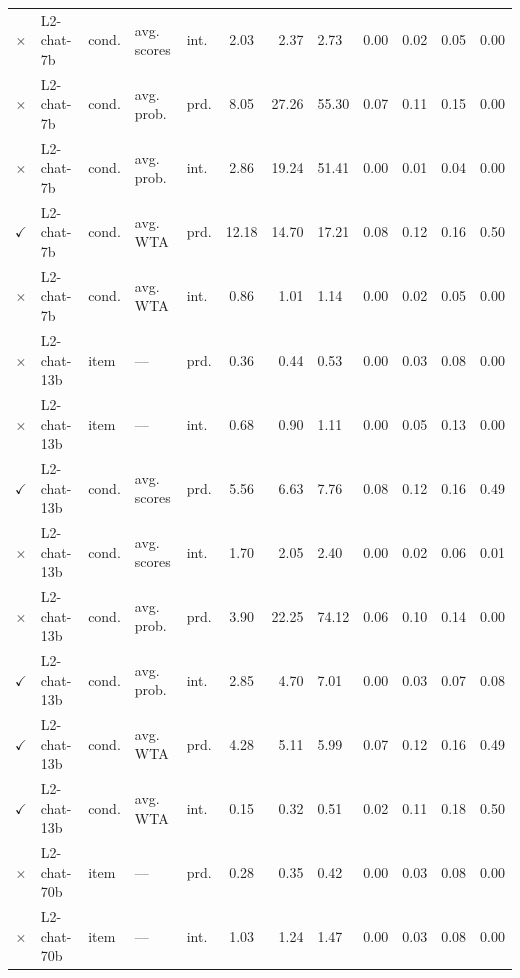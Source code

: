 \documentclass[fleqn]{article}
\begin{document}
\begin{table}[]
\begin{tabular}{cllllcrlcrlc}
  \textcolor{shimmer-main}{$\times$} & L2-chat-7b  & cond. & avg. scores & int. & 2.03  & 2.37   & 2.73   & 0.00 & 0.02 & 0.05 & 0.00 \\
  \textcolor{shimmer-main}{$\times$} & L2-chat-7b  & cond. & avg. prob.  & prd. & 8.05  & 27.26  & 55.30  & 0.07 & 0.11 & 0.15 & 0.00 \\
  \textcolor{shimmer-main}{$\times$} & L2-chat-7b  & cond. & avg. prob.  & int. & 2.86  & 19.24  & 51.41  & 0.00 & 0.01 & 0.04 & 0.00 \\
  \textcolor{fern-main}{$\checkmark$} & L2-chat-7b  & cond. & avg. WTA    & prd. & 12.18 & 14.70  & 17.21  & 0.08 & 0.12 & 0.16 & 0.50 \\
  \textcolor{shimmer-main}{$\times$} & L2-chat-7b  & cond. & avg. WTA    & int. & 0.86  & 1.01   & 1.14   & 0.00 & 0.02 & 0.05 & 0.00 \\ \addlinespace[0.5em]
  \textcolor{shimmer-main}{$\times$} & L2-chat-13b & item  & ---         & prd. & 0.36  & 0.44   & 0.53   & 0.00 & 0.03 & 0.08 & 0.00 \\
  \textcolor{shimmer-main}{$\times$} & L2-chat-13b & item  & ---         & int. & 0.68  & 0.90   & 1.11   & 0.00 & 0.05 & 0.13 & 0.00 \\
  \textcolor{fern-main}{$\checkmark$} & L2-chat-13b & cond. & avg. scores & prd. & 5.56  & 6.63   & 7.76   & 0.08 & 0.12 & 0.16 & 0.49 \\
  \textcolor{shimmer-main}{$\times$} & L2-chat-13b & cond. & avg. scores & int. & 1.70  & 2.05   & 2.40   & 0.00 & 0.02 & 0.06 & 0.01 \\
  \textcolor{shimmer-main}{$\times$} & L2-chat-13b & cond. & avg. prob.  & prd. & 3.90  & 22.25  & 74.12  & 0.06 & 0.10 & 0.14 & 0.00 \\
  \textcolor{fern-main}{$\checkmark$} & L2-chat-13b & cond. & avg. prob.  & int. & 2.85  & 4.70   & 7.01   & 0.00 & 0.03 & 0.07 & 0.08 \\
  \textcolor{fern-main}{$\checkmark$} & L2-chat-13b & cond. & avg. WTA    & prd. & 4.28  & 5.11   & 5.99   & 0.07 & 0.12 & 0.16 & 0.49 \\
  \textcolor{fern-main}{$\checkmark$} & L2-chat-13b & cond. & avg. WTA    & int. & 0.15  & 0.32   & 0.51   & 0.02 & 0.11 & 0.18 & 0.50 \\ \addlinespace[0.5em]
  \textcolor{shimmer-main}{$\times$} & L2-chat-70b & item  & ---         & prd. & 0.28  & 0.35   & 0.42   & 0.00 & 0.03 & 0.08 & 0.00 \\
  \textcolor{shimmer-main}{$\times$} & L2-chat-70b & item  & ---         & int. & 1.03  & 1.24   & 1.47   & 0.00 & 0.03 & 0.08 & 0.00 \\

\end{tabular}
\end{table}
\end{document}

